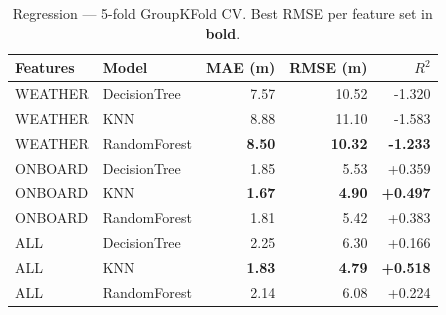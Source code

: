 \begin{table}[t]
\centering
\caption{Regression --- 5-fold GroupKFold CV. Best RMSE per feature set in \textbf{bold}.}
\label{tab:reg_final}
\begin{tabular}{llrrr}
\toprule
Features & Model & MAE (m) & RMSE (m) & $R^2$ \\
\midrule
WEATHER & DecisionTree & 7.57 & 10.52 & -1.320 \\
WEATHER & KNN & 8.88 & 11.10 & -1.583 \\
WEATHER & RandomForest & \textbf{8.50} & \textbf{10.32} & \textbf{-1.233} \\
\midrule
ONBOARD & DecisionTree & 1.85 & 5.53 & +0.359 \\
ONBOARD & KNN & \textbf{1.67} & \textbf{4.90} & \textbf{+0.497} \\
ONBOARD & RandomForest & 1.81 & 5.42 & +0.383 \\
\midrule
ALL & DecisionTree & 2.25 & 6.30 & +0.166 \\
ALL & KNN & \textbf{1.83} & \textbf{4.79} & \textbf{+0.518} \\
ALL & RandomForest & 2.14 & 6.08 & +0.224 \\
\midrule
\bottomrule
\end{tabular}
\end{table}

